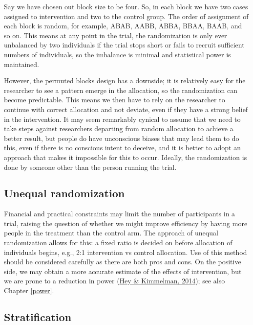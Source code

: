 \documentclass{krantz}
\begin{document}
Say we have chosen out block size to be four. So, in each block we have two cases assigned to intervention and two to the control group. The order of assignment of each block is random, for example, ABAB, AABB, ABBA, BBAA, BAAB, and so on. This means at any point in the trial, the randomization is only ever unbalanced by two individuals if the trial stops short or fails to recruit sufficient numbers of individuals, so the imbalance is minimal and statistical power is maintained.

However, the permuted blocks design has a downside; it is relatively easy for the researcher to see a pattern emerge in the allocation, so the randomization can become predictable. This means we then have to rely on the researcher to continue with correct allocation and not deviate, even if they have a strong belief in the intervention. It may seem remarkably cynical to assume that we need to take steps against researchers departing from random allocation to achieve a better result, but people do have unconscious biases that may lead them to do this, even if there is no conscious intent to deceive, and it is better to adopt an approach that makes it impossible for this to occur. Ideally, the randomization is done by someone other than the person running the trial.

\hypertarget{unequal-randomization}{%
\subsection{Unequal randomization}\label{unequal-randomization}}

Financial and practical constraints may limit the number of participants in a trial, raising the question of whether we might improve efficiency by having more people in the treatment than the control arm. The approach of unequal randomization allows for this: a fixed ratio is decided on before allocation of individuals begins, e.g., 2:1 intervention vs control allocation. Use of this method should be considered carefully as there are both pros and cons. On the positive side, we may obtain a more accurate estimate of the effects of intervention, but we are prone to a reduction in power (\protect\hyperlink{ref-hey2014}{Hey \& Kimmelman, 2014}); see also Chapter \ref{power}.

\hypertarget{stratification}{%
\subsection{Stratification}\label{stratification}}
\end{document}
